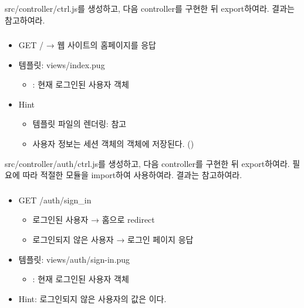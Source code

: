 src/controller/ctrl.js를 생성하고, 다음 controller를 구현한 뒤 export하여라. 결과는 \를 참고하여라.

\subsubsection*{}
\begin{itemize}
    \item GET / → 웹 사이트의 홈페이지를 응답
    \item 템플릿: views/index.pug
    \begin{itemize}
        \item {}: 현재 로그인된 사용자 객체
    \end{itemize}
    \item Hint
    \begin{itemize}
        \item 템플릿 파일의 렌더링:  참고
        \item 사용자 정보는 세션 객체의  객체에 저장된다. ()
    \end{itemize}
\end{itemize}

src/controller/auth/ctrl.js를 생성하고, 다음 controller를 구현한 뒤 export하여라. 필요에 따라 적절한 모듈을 import하여 사용하여라. 결과는 \를 참고하여라.

\subsubsection*{}
\begin{itemize}
    \item GET /auth/sign\_in
    \begin{itemize}
        \item 로그인된 사용자 → 홈으로 redirect
        \item 로그인되지 않은 사용자 → 로그인 페이지 응답
    \end{itemize}
    \item 템플릿: views/auth/sign-in.pug
    \begin{itemize}
        \item {}: 현재 로그인된 사용자 객체
    \end{itemize}
    \item Hint: 로그인되지 않은 사용자의  값은 이다.
\end{itemize}

